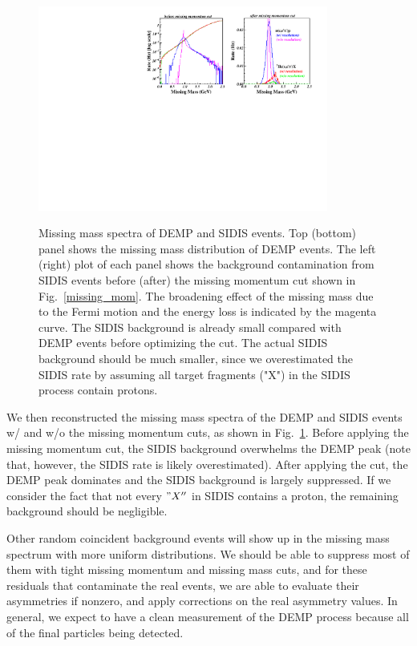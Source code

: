 \begin{figure}[!ht]
 \begin{center}
      \includegraphics[type=pdf,
        ext=.pdf,read=.pdf,width=0.85\textwidth]{./figures/Missing_Mass_Fermi_Rad_1Hz} \\
   \caption[Missing Mass]{\footnotesize{Missing mass spectra of DEMP and SIDIS
events. Top (bottom) panel shows the missing mass distribution of DEMP events. 
 The left (right) plot of each panel 
shows the background contamination from SIDIS events before (after) the
missing momentum cut shown in Fig.~\ref{missing_mom}. The broadening effect of
the missing mass due to the Fermi motion and the energy loss is indicated by the magenta
curve. The SIDIS background is already small compared with DEMP events before
optimizing the cut. The actual SIDIS background should be much smaller, since
we overestimated the SIDIS rate by assuming all target fragments ("X") in the
SIDIS process contain protons.}}
  \label{missing_mass}
  \end{center}
\end{figure}

We then reconstructed the missing mass spectra of the DEMP and SIDIS events w/
and w/o the missing momentum cuts, as shown in Fig.~\ref{missing_mass}. Before
applying the missing momentum cut, the SIDIS background overwhelms the DEMP
peak (note that, however, the SIDIS rate is likely overestimated). After applying the
cut, the DEMP peak dominates and the SIDIS background is largely suppressed. If
we consider the fact that not every $"X''$ in SIDIS contains a proton, the
remaining background should be negligible.

Other random coincident background events will show up in the missing mass
spectrum with more uniform distributions. We should be able to suppress most of
them with tight missing momentum and missing mass cuts, and for these residuals
that contaminate the real events, we are able to evaluate their asymmetries if
nonzero, and apply corrections on the real asymmetry values. In general, we
expect to have a clean measurement of the DEMP process because all of the final
particles being detected.

